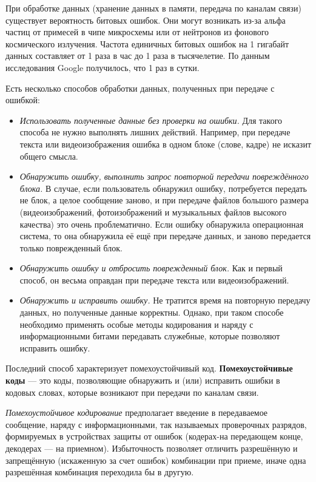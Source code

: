 При обработке данных (хранение данных в памяти, передача по каналам связи) существует вероятность битовых ошибок. Они могут возникать из-за альфа частиц от примесей в чипе микросхемы или от нейтронов из фонового космического излучения. Частота единичных битовых ошибок на 1 гигабайт данных составляет от 1 раза в час до 1 раза в тысячелетие. По данным исследования Google получилось, что 1 раз в сутки.

Есть несколько способов обработки данных, полученных при передаче с ошибкой:

\begin{itemize}
    \item \emph{Использовать полученные данные без проверки на ошибки.} Для такого способа не нужно выполнять лишних действий. Например, при передаче текста или видеоизображения ошибка в одном блоке (слове, кадре) не исказит общего смысла.
    \item \emph{Обнаружить ошибку, выполнить запрос повторной передачи по\-вре\-ждё\-нно\-го блока.} В случае, если пользователь обнаружил ошибку, потребуется передать не блок, а целое сообщение заново, и при передаче файлов большого размера (видеоизображений, фотоизображений и музыкальных файлов высокого качества) это очень проблематично. Если ошибку обнаружила операционная система, то она обнаружила её ещё при передаче данных, и заново передается только поврежденный блок.
    \item \emph{Обнаружить ошибку и отбросить поврежденный блок.} Как и первый способ, он весьма оправдан при передаче текста или видеоизображений.
    \item \emph{Обнаружить и исправить ошибку.} Не тратится время на повторную передачу данных, но полученные данные корректны. Однако, при таком способе необходимо применять особые методы кодирования и наряду с информационными битами передавать служебные, которые позволяют исправить ошибку.
\end{itemize}

\noindent
Последний способ характеризует помехоустойчивый код.
\textbf {Помехоустойчивые коды} --- это коды, позволяющие обнаружить и (или) исправить ошибки в кодовых словах, которые возникают при передачи по каналам связи.

\bigskip
\noindent\emph{Помехоустойчивое кодирование} предполагает введение в передаваемое сообщение, наряду с информационными, так называемых проверочных разрядов, формируемых в устройствах защиты от ошибок (кодерах-на передающем конце, декодерах --- на приемном). Избыточность позволяет отличить разрешённую и запрещённую (искаженную за счет ошибок) комбинации при приеме, иначе одна разрешённая комбинация переходила бы в другую.

